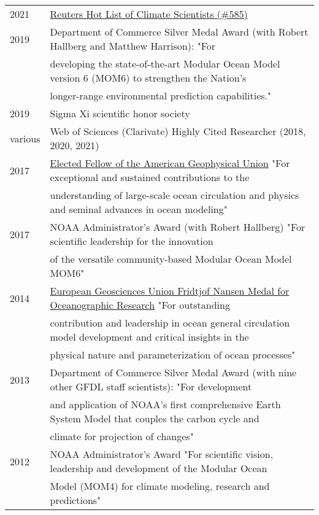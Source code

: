\documentclass{article}
\begin{document}
\begin{tabular}{ll}
  2021 & \href{https://app.dimensions.ai/details/entities/publication/author/ur.010052126545.52}{Reuters Hot List of Climate Scientists (\#585)} 
  \\
  2019 & Department of Commerce Silver Medal Award (with Robert Hallberg and Matthew Harrison): "For \\ &  developing the state-of-the-art Modular Ocean Model version 6 (MOM6) to strengthen the Nation's \\& longer-range environmental prediction capabilities."
  \\
  2019 & Sigma Xi scientific honor society 
  \\
  various  & Web of Sciences (Clarivate) Highly Cited Researcher (2018, 2020, 2021)
  \\
  2017 & \href{https://eos.org/agu-news/celebrating-the-2017-class-of-fellows}{Elected Fellow of the American Geophysical Union} "For exceptional and sustained contributions to the \\ &  understanding of large-scale ocean circulation and physics and seminal advances in ocean modeling"
\\
  2017 & NOAA Administrator's Award (with Robert Hallberg) "For scientific leadership for the innovation \\ & of the versatile  community-based Modular Ocean Model MOM6" 
  \\
  2014 & \href{http://www.egu.eu/awards-medals/fridtjof-nansen/2014/stephen-m-griffies/}{European Geosciences Union Fridtjof Nansen Medal for
         Oceanographic Research}  "For 
outstanding \\ & contribution and leadership in 
ocean general circulation model development 
and critical insights in the \\ & physical 
nature and parameterization of ocean processes"
\\
  2013 & Department of Commerce Silver Medal Award (with nine other
  GFDL staff scientists): 
  "For development \\ & and application of NOAA's first comprehensive  
  Earth System Model  
  that couples the carbon cycle and \\ & climate for projection of changes" \\
  2012 & NOAA Administrator's Award "For scientific vision, leadership
  and development of 
  the Modular Ocean \\ & Model (MOM4) for climate modeling, research and
  predictions" \\

\end{tabular}
\end{document}
